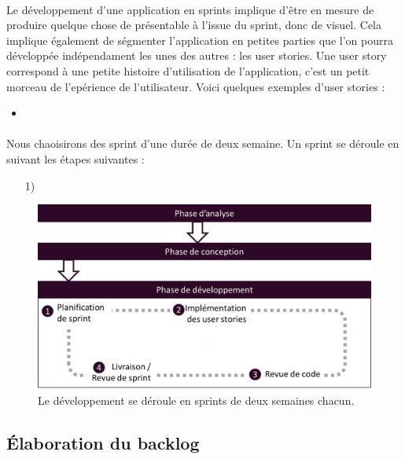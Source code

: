 			\paragraph{}%
			Le développement d'une application en sprints implique d'être en mesure de
			produire quelque chose de présentable à l'issue du sprint, donc de visuel.
			Cela implique également de ségmenter l'application en petites parties que
			l'on pourra développée indépendament les unes des autres : les user stories.
			Une user story correspond à une petite histoire d'utilisation de
			l'application, c'est un petit morceau de l'epérience de l'utilisateur. Voici
			quelques exemples d'user stories :
			\begin{itemize}
			  \item 
			\end{itemize}
			
			\paragraph{}%
			Nous chaoisirons des sprint d'une durée de deux semaine. Un sprint se déroule
			en suivant les étapes suivantes :
			\begin{itemize}
			  \item[1) ] 
			\end{itemize}
			
			
			\begin{figure}[H]%
				\centering
				\includegraphics[width=15cm]{../img/part3/methodo_dev.png}
				\caption{\label{methodo_dev} Le développement se déroule en sprints de
				deux semaines chacun.}
			\end{figure}
		
		\subsection{Élaboration du backlog}
